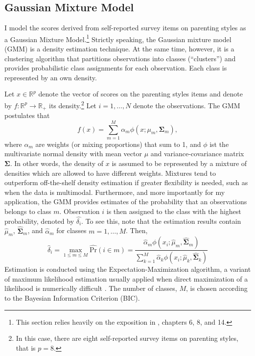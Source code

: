 \subsection{Gaussian Mixture Model}
I model the scores derived from self-reported survey items on parenting styles as a Gaussian Mixture Model.\footnote{
	This section relies heavily on the exposition in \textcite{hastieElementsStatisticalLearning2009}, chapters 6, 8, and 14.
} Strictly speaking, the Gaussian mixture model (GMM) is a density estimation technique. At the same time, however, it is a clustering algorithm that partitions observations into classes (``clusters'') and provides probabilistic class assignments for each observation. Each class is represented by an own density. 

Let $x \in \mathbb{R}^p$ denote the vector of scores on the parenting styles items and denote by $f: \mathbb{R}^p \longrightarrow \mathbb{R}_{+}$ its density.\footnote{
	In this case, there are eight self-reported survey items on parenting styles, that is $p=8$.
} Let $i = 1,\ldots,N$ denote the observations. The GMM postulates that 
\begin{equation*}
	f(x) = \sum_{m=1}^{M} \alpha_m \phi(x; \mu_m, \bm{\Sigma}_m),
\end{equation*}
where $\alpha_m$ are weights (or mixing proportions) that sum to 1, and $\phi$ ist the multivariate normal density with mean vector $\mu$ and variance-covariance matrix $\bm{\Sigma}$. In other words, the density of $x$ is assumed to be represented by a mixture of densities which are allowed to have different weights. Mixtures tend to outperform off-the-shelf density estimation if greater flexibility is needed, such as when the data is multimodal.
Furthermore, and more importantly for my application, the GMM provides estimates of the probability that an observations belongs to class $m$. Observation $i$ is then assigned to the class with the highest probability, denoted by $\widehat{\delta_i}$. To see this, note that the estimation results contain $\widehat{\mu}_m$, $\widehat{\bm{\Sigma}}_m$, and $\widehat{\alpha}_m$ for classes $m = 1,\ldots, M$. Then,
\begin{equation*}
	\widehat{\delta}_i = \max_{1 \leqslant m \leqslant M} \widehat{\text{Pr}}(i \in m) = \frac{\widehat{\alpha}_m \phi(x_i; \widehat{\mu}_m, \widehat{\bm{\Sigma}}_m)}{\sum_{k=1}^{M} \widehat{\alpha}_k \phi(x_i; \widehat{\mu}_k, \widehat{\bm{\Sigma}}_k)}
\end{equation*}
Estimation is conducted using the Expectation-Maximization algorithm, a variant of maximum likelihood estimation usually applied when direct maximization of a likelihood is numerically difficult \parencite[see][section 8.5 for details]{hastieElementsStatisticalLearning2009}. The number of classes, $M$, is chosen according to the Bayesian Information Criterion (BIC).


